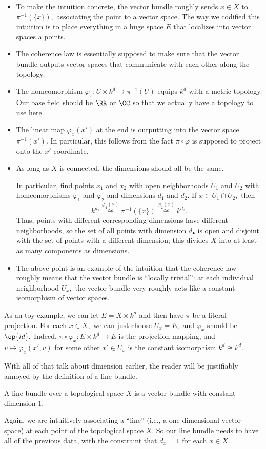 \begin{itemize}
    \item To make the intuition concrete, the vector bundle roughly sends $x\in X$ to $\pi^{-1}(\{x\}),$ associating the point to a vector space. The way we codified this intuition is to place everything in a huge space $E$ that localizes into vector spaces a points.
    \item The coherence law is essentially supposed to make sure that the vector bundle outputs vector spaces that communicate with each other along the topology.
    \item The homeomorphism $\varphi_x:U\times k^d\to\pi^{-1}(U)$ equips $k^d$ with a metric topology. Our base field should be $\RR$ or $\CC$ so that we actually have a topology to use here.
    \item The linear map $\varphi_x(x')$ at the end is outputting into the vector space $\pi^{-1}(x').$ In particular, this follows from the fact $\pi\circ\varphi$ is supposed to project onto the $x'$ coordinate.
    \item As long as $X$ is connected, the dimensions should all be the same.
    
    In particular, find points $x_1$ and $x_2$ with open neighborhoods $U_1$ and $U_2$ with homeomorphisms $\varphi_1$ and $\varphi_2$ and dimensions $d_1$ and $d_2.$ If $x\in U_1\cap U_2,$ then
    \[k^{d_1}\stackrel{\varphi_1(x)}\cong\pi^{-1}(\{x\})\stackrel{\varphi_2(x)}\cong k^{d_2}.\]
    Thus, points with different corresponding dimensions have different neighborhoods, so the set of all points with dimension $d_\bullet$ is open and disjoint with the set of points with a different dimension; this divides $X$ into at least as many components as dimensions.
    \item The above point is an example of the intuition that the coherence law roughly means that the vector bundle is ``locally trivial'': at each individual neighborhood $U_x,$ the vector bundle very roughly acts like a constant isomorphism of vector spaces.
\end{itemize}
As an toy example, we can let $E=X\times k^d$ and then have $\pi$ be a literal projection. For each $x\in X,$ we can just choose $U_x=E,$ and $\varphi_x$ should be $\op{id}.$ Indeed, $\pi\circ\varphi_x:E\times k^d\to E$ is the projection mapping, and $v\mapsto\varphi_x(x',v)$ for some other $x'\in U_x$ is the constant isomorphism $k^d\cong k^d.$

With all of that talk about dimension earlier, the reader will be justifiably annoyed by the definition of a line bundle.
\begin{definition}
    A line bundle over a topological space $X$ is a vector bundle with constant dimension $1.$
\end{definition}
Again, we are intuitively associating a ``line'' (i.e., a one-dimensional vector space) at each point of the topological space $X.$ So our line bundle needs to have all of the previous data, with the constraint that $d_x=1$ for each $x\in X.$


